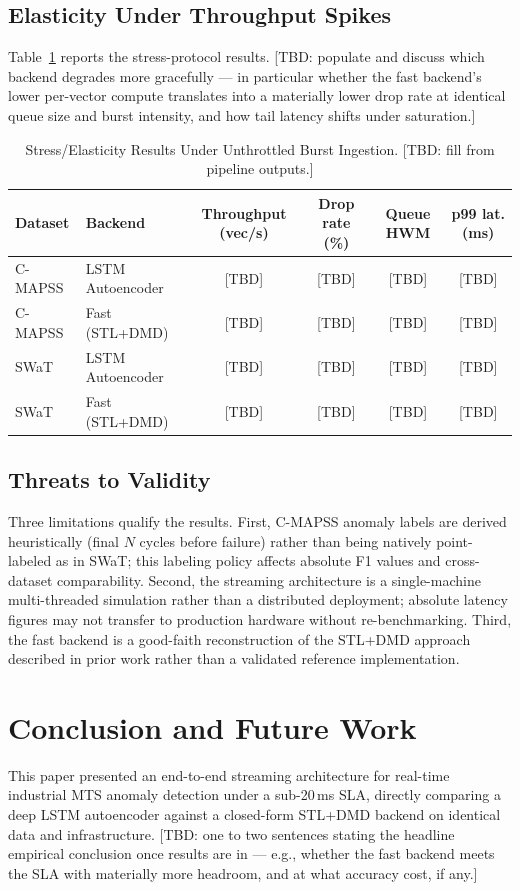 \subsection{Elasticity Under Throughput Spikes}
Table~\ref{tab:stress} reports the stress-protocol results.
[TBD: populate and discuss which backend degrades more gracefully ---
in particular whether the fast backend's lower per-vector compute
translates into a materially lower drop rate at identical queue size and
burst intensity, and how tail latency shifts under saturation.]

\begin{table}[!t]
\caption{Stress/Elasticity Results Under Unthrottled Burst Ingestion.
[TBD: fill from pipeline outputs.]}
\label{tab:stress}
\centering
\begin{tabular}{llcccc}
\hline
Dataset & Backend & Throughput (vec/s) & Drop rate (\%) & Queue HWM & p99 lat. (ms) \\
\hline
C-MAPSS & LSTM Autoencoder & [TBD] & [TBD] & [TBD] & [TBD] \\
C-MAPSS & Fast (STL+DMD)   & [TBD] & [TBD] & [TBD] & [TBD] \\
SWaT    & LSTM Autoencoder & [TBD] & [TBD] & [TBD] & [TBD] \\
SWaT    & Fast (STL+DMD)   & [TBD] & [TBD] & [TBD] & [TBD] \\
\hline
\end{tabular}
\end{table}

\subsection{Threats to Validity}
Three limitations qualify the results. First, C-MAPSS anomaly labels are
derived heuristically (final $N$ cycles before failure) rather than being
natively point-labeled as in SWaT; this labeling policy affects absolute
F1 values and cross-dataset comparability. Second, the streaming
architecture is a single-machine multi-threaded simulation rather than a
distributed deployment; absolute latency figures may not transfer to
production hardware without re-benchmarking. Third, the fast backend is a
good-faith reconstruction of the STL+DMD approach described in prior work
rather than a validated reference implementation.

\section{Conclusion and Future Work}
This paper presented an end-to-end streaming architecture for real-time
industrial MTS anomaly detection under a sub-20\,ms SLA, directly
comparing a deep LSTM autoencoder against a closed-form STL+DMD backend on
identical data and infrastructure. [TBD: one to two sentences stating the
headline empirical conclusion once results are in --- e.g., whether the
fast backend meets the SLA with materially more headroom, and at what
accuracy cost, if any.]

